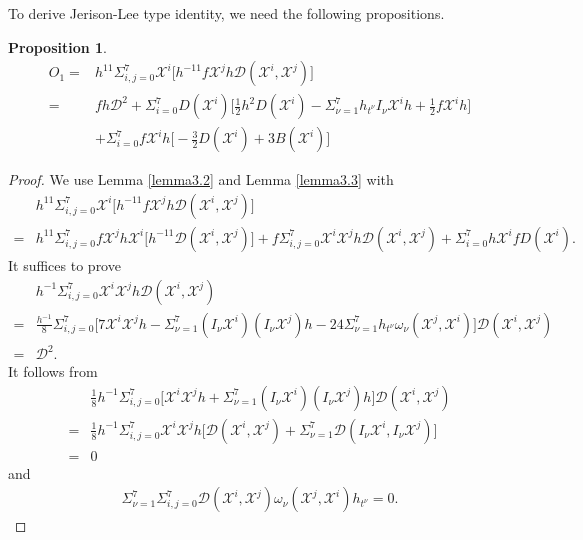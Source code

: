 \documentclass[10pt,a4paper]{amsart}
\numberwithin{equation}{section}
\newtheorem{proposition}[theorem]{Proposition}
\begin{document}
 To derive Jerison-Lee type identity, we need the following propositions.        
\begin{proposition}
    \begin{equation}
    \begin{aligned}
O_1=&h^{11}\Sigma_{i,j=0}^7\mathscr{X}^i\bigg[h^{-11}f\mathscr{X}^j h\mathcal{D}(\mathscr{X}^i,\mathscr{X}^j)\bigg]\\=& fh\mathcal{D}^2+\Sigma_{i=0}^7D(\mathscr{X}^i)\bigg[\frac{1}{2}h^2D(\mathscr{X}^i)-\Sigma_{\nu=1}^7h_{t^\nu}I_\nu \mathscr{X}^i h+\frac{1}{2}f\mathscr{X}^i h\bigg]\\&+\Sigma_{i=0}^7 f\mathscr{X}^i h\bigg[-\frac{3}{2}D(\mathscr{X}^i)+3B(\mathscr{X}^i)\bigg] 
\end{aligned}
    \end{equation}
\end{proposition}
\begin{proof}
We use Lemma \ref{lemma3.2} and Lemma \ref{lemma3.3} with
    \begin{equation*}
    \begin{aligned}
&h^{11}\Sigma_{i,j=0}^7\mathscr{X}^i\bigg[h^{-11}f\mathscr{X}^j h\mathcal{D}(\mathscr{X}^i,\mathscr{X}^j)\bigg]\\=&h^{11}\Sigma_{i,j=0}^7     f\mathscr{X}^j h\mathscr{X}^i\bigg[h^{-11}\mathcal{D}(\mathscr{X}^i,\mathscr{X}^j)\bigg]+f\Sigma_{i,j=0}^7\mathscr{X}^i\mathscr{X}^j h \mathcal{D}(\mathscr{X}^i,\mathscr{X}^j)+\Sigma_{i=0}^7h\mathscr{X}^if D(\mathscr{X}^i).
\end{aligned}
    \end{equation*}
    It suffices to prove
\begin{align*}
    &h^{-1}\Sigma_{i,j=0}^7\mathscr{X}^i\mathscr{X}^j h \mathcal{D}(\mathscr{X}^i,\mathscr{X}^j)\\=&\frac{h^{-1}}{8}\Sigma_{i,j=0}^7\bigg[7\mathscr{X}^i\mathscr{X}^j h-\Sigma_{\nu=1}^7(I_\nu \mathscr{X}^i )(I_\nu \mathscr{X}^j)h-24\Sigma_{\nu=1}^7h_{t^\nu}\omega_\nu (\mathscr{X}^j,\mathscr{X}^i) \bigg]\mathcal{D}(\mathscr{X}^i,\mathscr{X}^j)    \\=&\mathcal{D}^2.
    \end{align*}    
  It follows from
  \begin{align*}
       &\frac{1}{8}h^{-1}\Sigma_{i,j=0}^7\bigg[\mathscr{X}^i\mathscr{X}^j h+
       \Sigma_{\nu=1}^7(I_\nu \mathscr{X}^i )(I_\nu \mathscr{X}^j)h       
       \bigg]\mathcal{D}(\mathscr{X}^i,\mathscr{X}^j)\\=&\frac{1}{8}h^{-1}\Sigma_{i,j=0}^7 \mathscr{X}^i\mathscr{X}^jh\bigg[\mathcal{D}(\mathscr{X}^i,\mathscr{X}^j)+\Sigma_{\nu=1}^7\mathcal{D}(I_\nu \mathscr{X}^i,I_\nu \mathscr{X}^j)    \bigg]\\=&0       
       \end{align*}
       and
       \begin{align*}
\Sigma_{\nu=1}^7\Sigma_{i,j=0}^7\mathcal{D}(\mathscr{X}^i,\mathscr{X}^j)\omega_\nu(\mathscr{X}^j,\mathscr{X}^i)h_{t^\nu}=0.
\end{align*}

\end{proof}
\end{document}
